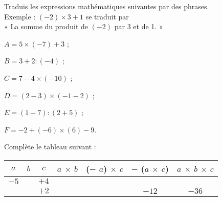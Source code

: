 \begin{exercice}
Traduis les expressions mathématiques suivantes par des phrases. \\[0.2em]
Exemple : $(-2) \times 3 + 1$ se traduit par \\[0.2em]
« \textcolor{A1}{La somme du produit de $(-2)$ par 3 et de 1.} »\\
{\small
\begin{colenumerate}{2}
 \item $A = 5 \times (-7) + 3$ ;
 \item $B = 3 + 2 : (-4)$ ;
 \item $C = 7 - 4 \times (-10)$ ;
 \item $D = (2 - 3) \times (-1 - 2)$ ;
 \item $E = (1 - 7) : (2 + 5)$ ;
 \item $F = -2 +(-6) \times (6) - 9$.
 \end{colenumerate}}
\end{exercice}


\begin{exercice}
Complète le tableau suivant :
{\small
\begin{center}
\begin{tabular}{|c|c|c|c|c|c|c|}
\hline
\cellcolor{H2} $a$ & \cellcolor{H2} $b$ & \cellcolor{H2} $c$ & \cellcolor{A2} $a$ $\times$ $b$ &  \cellcolor{A2} ($-$ $a$) $\times$ $c$ &  \cellcolor{A2} $-$ ($a$ $\times$ $c$) &  \cellcolor{A2} $a$ $\times$ $b$ $\times$ $c$ \\\hline 
\cellcolor{H3} $-5$ & \cellcolor{H3} & \cellcolor{H3} $+4$ & \cellcolor{A3} & \cellcolor{A3} & \cellcolor{A3} & \cellcolor{A3} \\\hline
\cellcolor{H3} & \cellcolor{H3} & \cellcolor{H3} $+2$ & \cellcolor{A3} & \cellcolor{A3} & \cellcolor{A3} $-12$ & \cellcolor{A3} $-36$ \\\hline
 \end{tabular}
 \end{center}
 } %
\end{exercice}

